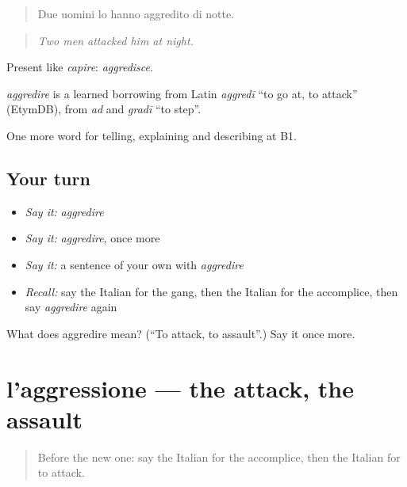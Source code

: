 \begin{quote}
Due uomini lo hanno aggredito di notte.
\end{quote}

\begin{quote}
\emph{Two men attacked him at night.}
\end{quote}

Present like \emph{capire}: \emph{aggredisce}.

\begin{cousinweb}
\emph{aggredire} is a learned borrowing from Latin \emph{aggredī} \textquotedblleft{}to go at, to attack\textquotedblright{} (EtymDB), from \emph{ad} and \emph{gradī} \textquotedblleft{}to step\textquotedblright{}.
\end{cousinweb}

\begin{grammarlens}[title={What you've built}]
One more word for telling, explaining and describing at B1.
\end{grammarlens}

\subsection*{Your turn}
\begin{itemize}
\raggedright
  \item \emph{Say it:} \emph{aggredire}
  \item \emph{Say it:} \emph{aggredire}, once more
  \item \emph{Say it:} a sentence of your own with \emph{aggredire}
  \item \emph{Recall:} say the Italian for the gang, then the Italian for the accomplice, then say \emph{aggredire} again
\end{itemize}

\begin{tcolorbox}[breakable,colback=teal!4,colframe=teal!35!black,title={Before you move on}]
What does aggredire mean? (\textquotedblleft{}To attack, to assault\textquotedblright{}.) Say it once more.
\end{tcolorbox}
\section[l'aggressione]{l'aggressione — the attack, the assault}

\label{lesson:IT-C298-aggressione}



\begin{quote}
Before the new one: say the Italian for the accomplice, then the Italian for to attack.
\end{quote}

